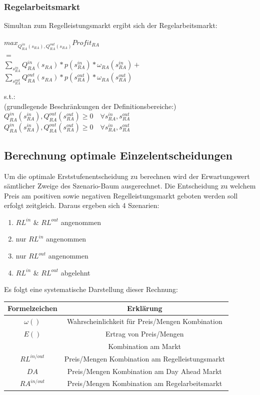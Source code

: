 \documentclass{article}
\begin{document}
\subsubsection{Regelarbeitsmarkt}
Simultan zum Regelleistungsmarkt ergibt sich der Regelarbeitsmarkt:
\begin{center}
	$max_{Q^{in}_{RA}(s_{RA}), Q^{out}_{RA}(s_{RA})} Profit_{RA}$\\ 
	$=$\\
	$\sum_{s^{in}_{RA}} Q^{in}_{RA}(s_{RA}) * p(s^{in}_{RA}) * \omega_{RA}(s^{in}_{RA}) +$\\
	$\sum_{s^{out}_{RA}} Q^{out}_{RA}(s_{RA}) * p(s^{out}_{RA}) * \omega_{RA}(s^{out}_{RA})$\\
\end{center}
s.t.:\\
	(grundlegende Beschränkungen der Definitionsbereiche:)\\
	$Q^{in}_{RA}(s^{in}_{RA}),Q^{out}_{RA}(s^{out}_{RA}) \geq 0 \quad\forall s^{in}_{RA},s^{out}_{RA} $\\
	$Q^{in}_{RA}(s^{in}_{RA}),Q^{out}_{RA}(s^{out}_{RA}) \geq 0\quad\forall  s^{in}_{RA},s^{out}_{RA} $\\


\subsection{Berechnung optimale Einzelentscheidungen}
Um die optimale Erststufenentscheidung zu berechnen wird der Erwartungswert sämtlicher Zweige des Szenario-Baum ausgerechnet.
Die Entscheidung zu welchem Preis am positiven sowie negativen Regelleistungsmarkt geboten werden soll erfolgt zeitgleich.
Daraus ergeben sich 4 Szenarien:
\begin{enumerate}
    \item $RL^{in}$ \& $RL^{out}$ angenommen
    \item nur $RL^{in}$ angenommen
    \item nur $RL^{out}$ angenommen
    \item $RL^{in}$ \& $RL^{out}$ abgelehnt
\end{enumerate}
Es folgt eine systematische Darstellung dieser Rechnung:

    \begin{tabular}{|c|c|}
     \hline
     Formelzeichen & Erklärung \\
      \hline
        $\omega()$ & Wahrscheinlichkeit für Preis/Mengen Kombination \\
       $E()$  &  Ertrag von Preis/Mengen \\
        &   Kombination am Markt \\
       $RL^{in/out}$  &Preis/Mengen Kombination am Regelleistungsmarkt\\ 
       $DA$  & Preis/Mengen Kombination am Day Ahead Markt\\ 
       $RA^{in/out}$  & Preis/Mengen Kombination am Regelarbeitsmarkt\\
        \hline
    \end{tabular}
    \caption{}
    \label{tab:my_label}
\end{document}
